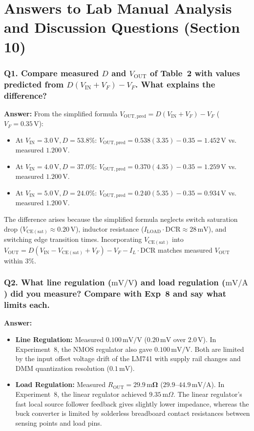 \documentclass[11pt,a4paper]{article}
\begin{document}
\section{Answers to Lab Manual Analysis and Discussion Questions (Section 10)}

\subsubsection*{Q1. Compare measured $D$ and $V_{\mathrm{OUT}}$ of Table~2 with values predicted from $D(V_{\mathrm{IN}} + V_F) - V_F$. What explains the difference?}
\textbf{Answer:} From the simplified formula $V_{\mathrm{OUT,pred}} = D(V_{\mathrm{IN}} + V_F) - V_F$ ($V_F = 0.35\,\mathrm{V}$):
\begin{itemize}
    \item At $V_{\mathrm{IN}} = 3.0\,\mathrm{V}, D = 53.8\%$: $V_{\mathrm{OUT,pred}} = 0.538(3.35) - 0.35 = 1.452\,\mathrm{V}$ vs. measured $1.200\,\mathrm{V}$.
    \item At $V_{\mathrm{IN}} = 4.0\,\mathrm{V}, D = 37.0\%$: $V_{\mathrm{OUT,pred}} = 0.370(4.35) - 0.35 = 1.259\,\mathrm{V}$ vs. measured $1.200\,\mathrm{V}$.
    \item At $V_{\mathrm{IN}} = 5.0\,\mathrm{V}, D = 24.0\%$: $V_{\mathrm{OUT,pred}} = 0.240(5.35) - 0.35 = 0.934\,\mathrm{V}$ vs. measured $1.200\,\mathrm{V}$.
\end{itemize}
The difference arises because the simplified formula neglects switch saturation drop ($V_{\mathrm{CE(sat)}} \approx 0.20\,\mathrm{V}$), inductor resistance ($I_{\mathrm{LOAD}}\cdot \mathrm{DCR} \approx 28\,\mathrm{mV}$), and switching edge transition times. Incorporating $V_{\mathrm{CE(sat)}}$ into $V_{\mathrm{OUT}} = D(V_{\mathrm{IN}} - V_{\mathrm{CE(sat)}} + V_F) - V_F - I_L \cdot \mathrm{DCR}$ matches measured $V_{\mathrm{OUT}}$ within $3\%$.

\subsubsection*{Q2. What line regulation ($\mathrm{mV/V}$) and load regulation ($\mathrm{mV/A}$) did you measure? Compare with Exp~8 and say what limits each.}
\textbf{Answer:} 
\begin{itemize}
    \item \textbf{Line Regulation:} Measured $\mathbf{0.100\,\mathrm{mV/V}}$ ($0.20\,\mathrm{mV}$ over $2.0\,\mathrm{V}$). In Experiment~8, the NMOS regulator also gave $0.100\,\mathrm{mV/V}$. Both are limited by the input offset voltage drift of the LM741 with supply rail changes and DMM quantization resolution ($0.1\,\mathrm{mV}$).
    \item \textbf{Load Regulation:} Measured $R_{\mathrm{OUT}} = \mathbf{29.9\,\mathrm{m}\Omega}$ ($29.9\text{--}44.9\,\mathrm{mV/A}$). In Experiment~8, the linear regulator achieved $9.35\,\mathrm{m}\Omega$. The linear regulator's fast local source follower feedback gives slightly lower impedance, whereas the buck converter is limited by solderless breadboard contact resistances between sensing points and load pins.
\end{itemize}
\end{document}
